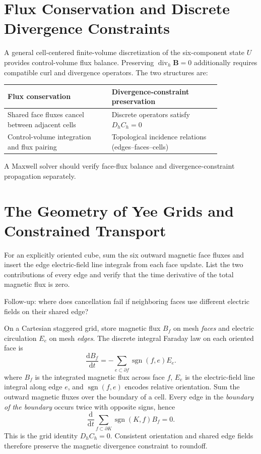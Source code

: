 \documentclass[11pt,openany]{book}
\numberwithin{equation}{chapter}
\theoremstyle{definition}
\theoremstyle{remark}
\newcommand{\dd}{\mathrm d}
\newcommand{\Div}{\operatorname{div}}
\begin{document}
\section{Flux Conservation and Discrete Divergence Constraints}
A general cell-centered finite-volume discretization of the six-component state $U$ provides control-volume flux balance.
Preserving $\Div_h\bm B=0$ additionally requires compatible curl and divergence operators.
The two structures are:
\begin{center}
\begin{tabular}{p{0.41\linewidth}p{0.43\linewidth}}
\toprule
Flux conservation & Divergence-constraint preservation\\
\midrule
Shared face fluxes cancel between adjacent cells & Discrete operators satisfy $D_hC_h=0$\\
Control-volume integration and flux pairing & Topological incidence relations (edges--faces--cells)\\
\bottomrule
\end{tabular}
\end{center}
A Maxwell solver should verify face-flux balance and divergence-constraint propagation separately.

\section{The Geometry of Yee Grids and Constrained Transport}
\begin{askai}
For an explicitly oriented cube, sum the six outward magnetic face fluxes and insert the edge electric-field line integrals from each face update.
List the two contributions of every edge and verify that the time derivative of the total magnetic flux is zero.

Follow-up: where does cancellation fail if neighboring faces use different electric fields on their shared edge?
\end{askai}
On a Cartesian staggered grid, store magnetic flux $B_f$ on mesh \emph{faces} and electric circulation $E_e$ on mesh \emph{edges}.
The discrete integral Faraday law on each oriented face is
\begin{equation}\label{eq:CT}
\frac{\dd B_f}{\dd t}=-\sum_{e\subset\partial f}\operatorname{sgn}(f,e)E_e.
\end{equation}
where $B_f$ is the integrated magnetic flux across face $f$, $E_e$ is the electric-field line integral along edge $e$, and $\operatorname{sgn}(f,e)$ encodes relative orientation.
Sum the outward magnetic fluxes over the boundary of a cell.
Every edge in the \emph{boundary of the boundary} occurs twice with opposite signs, hence
\begin{equation}\label{eq:dd0discrete}
\frac{\dd}{\dd t}\sum_{f\subset\partial K}\operatorname{sgn}(K,f)B_f=0.
\end{equation}
This is the grid identity $D_hC_h=0$.
Consistent orientation and shared edge fields therefore preserve the magnetic divergence constraint to roundoff.
\end{document}
